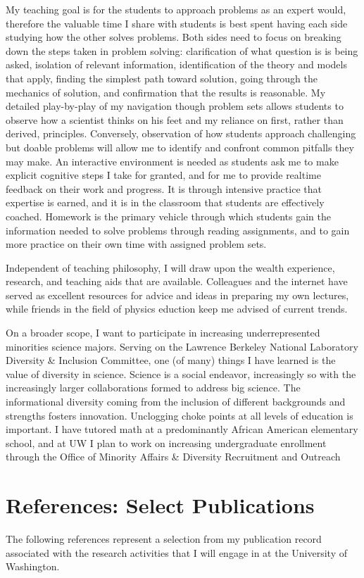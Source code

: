 \documentclass{article}
\begin{document}
My teaching goal is for the students to approach problems as an expert would, therefore
the valuable time I share with students is best spent having each side studying how the other
solves problems.  Both sides need to focus on breaking down the steps taken in problem solving: 
clarification of what question is is being asked,
isolation of relevant information, 
identification of the theory and models that apply, finding the simplest path toward solution,
going through the mechanics of solution, and confirmation that the results is reasonable.
My detailed play-by-play of my navigation though problem sets  allows students to observe how a scientist thinks on his
feet and my reliance on first, rather than derived, principles.  Conversely, observation of how students
approach challenging but doable problems will allow me to identify and confront common pitfalls they may make.
An interactive environment is needed as students ask me to make explicit cognitive steps I take for granted,
and for me to provide realtime feedback on their work and progress.
It is through intensive practice that expertise is earned, and it is in the classroom that students are effectively coached.
Homework is the primary vehicle through which students gain the information needed to solve problems
through reading assignments, and to gain more practice on their own time with assigned problem sets.

Independent of teaching philosophy, I will draw upon the wealth experience, research, and teaching aids that are
available.
Colleagues and the internet have served as excellent resources for advice and ideas in preparing
my own lectures, while friends in the field of physics eduction keep me advised of current trends. 

On a broader scope, I want to participate in increasing underrepresented minorities science majors.
Serving on the Lawrence Berkeley National Laboratory Diversity \& Inclusion Committee, one (of many) things I have
learned is the value of diversity in science.  Science is a social endeavor, increasingly so with
the increasingly larger collaborations formed to address big science.  The informational diversity
coming  from the inclusion of different  backgrounds and strengths fosters innovation.
Unclogging choke points at all levels of education is important.  I have tutored math at a predominantly African American
elementary school, and at UW I plan to work on increasing undergraduate enrollment through the
Office of Minority Affairs \& Diversity Recruitment and Outreach




\section{References: Select Publications}
The following references represent a selection from my publication record associated with the research
activities that I will engage in at the University of Washington.



\end{document}
